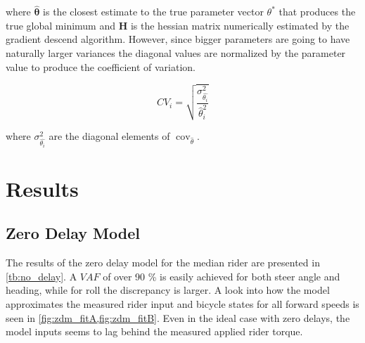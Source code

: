 where \ensuremath{\boldsymbol{\hat{\theta}}} is the closest estimate to the true parameter vector \ensuremath{\theta^*} that produces the true global minimum and \ensuremath{\boldsymbol{H}} is the hessian matrix numerically estimated by the gradient descend algorithm.  However, since bigger parameters are going to have naturally larger variances the diagonal values are normalized by the parameter value to produce the coefficient of variation.

\begin{equation}
    CV_{i}=\sqrt{\frac{\sigma^{2}_{\hat{\theta_i}}}{\hat{\theta}_i^2}}
    \end{equation}

    where \ensuremath{\sigma^{2}_{\hat{\theta_i}}} are the diagonal elements of \ensuremath{ \operatorname{cov}_{\hat{\theta}}}.


\section{Results}


\subsection{Zero Delay Model}
The results of the zero delay model for the median rider are presented in \cref{tb:no_delay}. A \ensuremath{\mathit{VAF}} of over 90 \% is easily achieved for both steer angle and heading, while for roll the discrepancy is larger. A  look into how the model approximates the measured rider input and bicycle states for all forward speeds is seen in \cref{fig:zdm_fitA,fig:zdm_fitB}. Even in the ideal case with zero delays, the model inputs seems to lag behind the measured applied rider torque.


